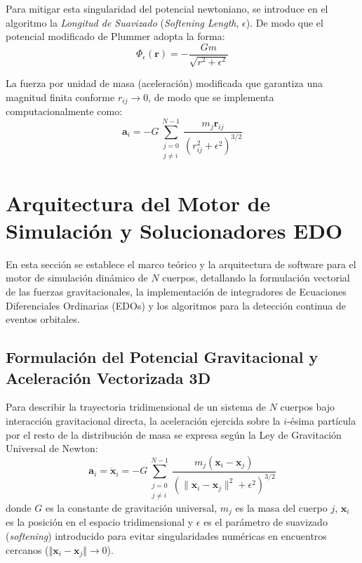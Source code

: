 \documentclass[11pt, a4paper]{article}
\begin{document}
	Para mitigar esta singularidad del potencial newtoniano, se introduce en el algoritmo la \textit{Longitud de Suavizado} (\textit{Softening Length}, $\epsilon$). De modo que el potencial modificado de Plummer adopta la forma:
	\begin{equation}
		\Phi_\epsilon(\mathbf{r}) = -\frac{G m}{\sqrt{r^2 + \epsilon^2}}
	\end{equation}
	
	La fuerza por unidad de masa (aceleración) modificada que garantiza una magnitud finita conforme $r_{ij} \to 0$, de modo que se implementa computacionalmente como:
	\begin{equation}
		\mathbf{a}_i = -G \sum_{\substack{j=0 \\ j \neq i}}^{N-1} \frac{m_j \mathbf{r}_{ij}}{\left(r_{ij}^2 + \epsilon^2\right)^{3/2}}
		\label{eq:softened_acc}
	\end{equation}
	
	\section{Arquitectura del Motor de Simulación y Solucionadores EDO}
	
	En esta sección se establece el marco teórico y la arquitectura de software para el motor de simulación dinámico de $N$ cuerpos, detallando la formulación vectorial de las fuerzas gravitacionales, la implementación de integradores de Ecuaciones Diferenciales Ordinarias (EDOs) y los algoritmos para la detección continua de eventos orbitales.
	
	\subsection{Formulación del Potencial Gravitacional y Aceleración Vectorizada 3D}
	
	Para describir la trayectoria tridimensional de un sistema de $N$ cuerpos bajo interacción gravitacional directa, la aceleración ejercida sobre la $i$-ésima partícula por el resto de la distribución de masa se expresa según la Ley de Gravitación Universal de Newton:
	\begin{equation}
		\mathbf{a}_i = \ddot{\mathbf{x}}_i = -G \sum_{\substack{j=0 \\ j \neq i}}^{N-1} \frac{m_j \left(\mathbf{x}_i - \mathbf{x}_j\right)}{\left(\|\mathbf{x}_i - \mathbf{x}_j\|^2 + \epsilon^2\right)^{3/2}}
		\label{eq:acc_vectorized_3d}
	\end{equation}
	donde $G$ es la constante de gravitación universal, $m_j$ es la masa del cuerpo $j$, $\mathbf{x}_i$ es la posición en el espacio tridimensional y $\epsilon$ es el parámetro de suavizado (\textit{softening}) introducido para evitar singularidades numéricas en encuentros cercanos ($\Vert{}\mathbf{x}_i - \mathbf{x}_j\Vert{} \to 0$).
	
\end{document}
